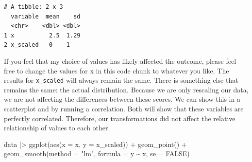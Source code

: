 \documentclass[
  letterpaper,
]{krantz}
\makeatletter
\newenvironment{Shaded}{\begin{snugshade}}{\end{snugshade}}
\newcommand{\AttributeTok}[1]{\textcolor[rgb]{0.40,0.45,0.13}{#1}}
\newcommand{\CommentTok}[1]{\textcolor[rgb]{0.37,0.37,0.37}{#1}}
\newcommand{\ConstantTok}[1]{\textcolor[rgb]{0.56,0.35,0.01}{#1}}
\newcommand{\DecValTok}[1]{\textcolor[rgb]{0.68,0.00,0.00}{#1}}
\newcommand{\FunctionTok}[1]{\textcolor[rgb]{0.28,0.35,0.67}{#1}}
\newcommand{\NormalTok}[1]{\textcolor[rgb]{0.00,0.23,0.31}{#1}}
\newcommand{\OtherTok}[1]{\textcolor[rgb]{0.00,0.23,0.31}{#1}}
\newcommand{\SpecialCharTok}[1]{\textcolor[rgb]{0.37,0.37,0.37}{#1}}
\newcommand{\StringTok}[1]{\textcolor[rgb]{0.13,0.47,0.30}{#1}}
\newenvironment{kframe}{%
\medskip{}
\setlength{\fboxsep}{.8em}
 \def\at@end@of@kframe{}%
 \ifinner\ifhmode%
  \def\at@end@of@kframe{\end{minipage}}%
  \begin{minipage}{\columnwidth}%
 \fi\fi%
 \def\FrameCommand##1{\hskip\@totalleftmargin \hskip-\fboxsep
 \colorbox{shadecolor}{##1}\hskip-\fboxsep
     \hskip-\linewidth \hskip-\@totalleftmargin \hskip\columnwidth}%
 \MakeFramed {\advance\hsize-\width
   \@totalleftmargin\z@ \linewidth\hsize
   \@setminipage}}%
 {\par\unskip\endMakeFramed%
 \at@end@of@kframe}
\renewenvironment{Shaded}{\begin{kframe}}{\end{kframe}}
\makeatother
\begin{document}
\begin{Shaded}
\end{Shaded}

\begin{verbatim}
# A tibble: 2 x 3
  variable  mean    sd
  <chr>    <dbl> <dbl>
1 x          2.5  1.29
2 x_scaled   0    1   
\end{verbatim}

If you feel that my choice of values has likely affected the outcome,
please feel free to change the values for x in this code chunk to
whatever you like. The results for \texttt{x\_scaled} will always remain
the same. There is something else that remains the same: the actual
distribution. Because we are only rescaling our data, we are not
affecting the differences between these scores. We can show this in a
scatterplot and by running a correlation. Both will show that these
variables are perfectly correlated. Therefore, our transformations did
not affect the relative relationship of values to each other.

\begin{Shaded}
\begin{Highlighting}[]
\NormalTok{data }\SpecialCharTok{|\textgreater{}}
  \FunctionTok{ggplot}\NormalTok{(}\FunctionTok{aes}\NormalTok{(}\AttributeTok{x =}\NormalTok{ x,}
             \AttributeTok{y =}\NormalTok{ x\_scaled)) }\SpecialCharTok{+}
  \FunctionTok{geom\_point}\NormalTok{() }\SpecialCharTok{+}
  \FunctionTok{geom\_smooth}\NormalTok{(}\AttributeTok{method =} \StringTok{"lm"}\NormalTok{,}
              \AttributeTok{formula =}\NormalTok{ y }\SpecialCharTok{\textasciitilde{}}\NormalTok{ x,}
              \AttributeTok{se =} \ConstantTok{FALSE}\NormalTok{)}
\end{Highlighting}
\end{Shaded}
\end{document}
